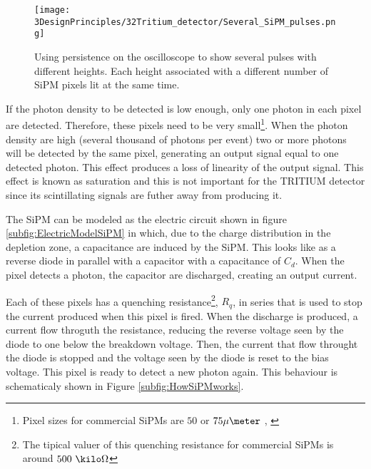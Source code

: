 \begin{figure}[htbp]
\centering
\texttt{[image: 3DesignPrinciples/32Tritium\_detector/Several\_SiPM\_pulses.png]}
\caption{Using persistence on the oscilloscope to show several pulses with different heights. Each height associated with a different number of  SiPM pixels lit at the same time.\label{fig:PulsesOfSiPM}}
\end{figure}

If the photon density to be detected is low enough, only one photon in each pixel are detected. Therefore, these pixels need to be very small\footnote{Pixel sizes for commercial SiPMs are $50$ or $75\mu\meter$ \cite{DataSheetHammamatsu_1_SiPM_50}, \cite{DataSheetHammamatsu_1_SiPM_75}}. When the photon density are high (several thousand of photons per event) two or more photons will be detected by the same pixel, generating an output signal equal to one detected photon. This effect produces a loss of linearity of the output signal. This effect is known as saturation and this is not important for the TRITIUM detector since its scintillating signals are futher away from producing it. %

The SiPM can be modeled as the electric circuit shown in figure \ref{subfig:ElectricModelSiPM} in which, due to the charge distribution in the depletion zone, a capacitance are induced by the SiPM. This looks like as a reverse diode in parallel with a capacitor with a capacitance of $C_d$. When the pixel detects a photon, the capacitor are discharged, creating an output current.

Each of these pixels has a quenching resistance\footnote{The tipical valuer of this quenching resistance for commercial SiPMs is around $500~\kilo\Omega$}, $R_q$, in series that is used to stop the current produced when this pixel is fired. When the discharge is produced, a current flow throguth the resistance, reducing the reverse voltage seen by the diode to one below the breakdown voltage. Then, the current that flow throught the diode is stopped and the voltage seen by the diode is reset to the bias voltage. This pixel is ready to detect a new photon again. This behaviour is schematicaly shown in Figure \ref{subfig:HowSiPMworks}.

